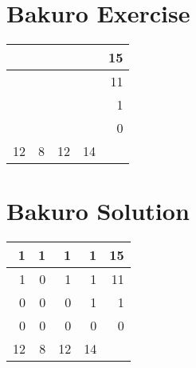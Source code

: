 \documentclass[]{article}
\begin{document}
            \section{Bakuro Exercise}\begin{tabular}{rrrrr}
\hline
    &   &    &    & 15 \\ \hline
    &   &    &    & 11 \\ \hline
    &   &    &    &  1 \\ \hline
    &   &    &    &  0 \\ \hline
 12 & 8 & 12 & 14 &    \\ \hline
\hline
\end{tabular}\newpage 
 \section{Bakuro Solution} 
\begin{tabular}{rrrrr}
\hline
  1 & 1 &  1 &  1 & 15 \\ \hline
  1 & 0 &  1 &  1 & 11 \\ \hline
  0 & 0 &  0 &  1 &  1 \\ \hline
  0 & 0 &  0 &  0 &  0 \\ \hline
 12 & 8 & 12 & 14 &    \\ \hline
\hline
\end{tabular}
 
\end{document}
